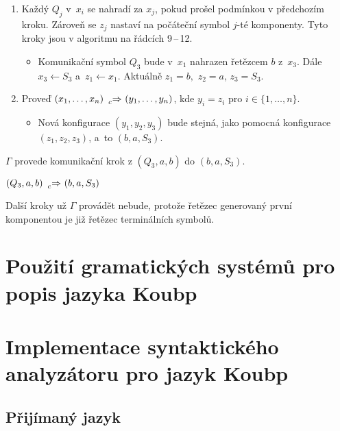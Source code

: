 \begin{example}
\begin{enumerate}
        \item Každý $Q_j$ v~$x_i$ se nahradí za $x_j$, pokud prošel podmínkou v předchozím kroku.
        Zároveň se $z_j$ nastaví na počáteční symbol $j$-té komponenty.
        Tyto kroky jsou v algoritmu na řádcích 9\,--\,12.
        \begin{itemize}[label=$\circ$]
            \item Komunikační symbol $Q_3$ bude v~$x_1$ nahrazen řetězcem $b$ z~$x_3$. Dále $x_3 \gets S_3$ a~$z_1 \gets x_1$.
            Aktuálně $z_1 = b,$ $z_2 = a$, $z_3 = S_3$. 
        \end{itemize}
        \item Proveď $(x_1, \ldots, x_n) \ \prescript{}{c}{\Rightarrow} \ (y_1, \ldots, y_n)$, kde $y_i = z_i$ pro $i \in \{1, \ldots, n\}$.
        \begin{itemize}[label=$\circ$]
            \item Nová konfigurace $(y_1, y_2, y_3)$ bude stejná, jako pomocná konfigurace $(z_1, z_2, z_3)$, a~to $(b, a, S_3)$.
        \end{itemize}
    \end{enumerate}
    $\Gamma$ provede komunikační krok z $(Q_3, a, b)$ do $(b, a, S_3)$.
    \begin{center}
        $(Q_3, a, b) \ \prescript{}{c}{\Rightarrow} \ (b, a, S_3)$
    \end{center}
    Další kroky už $\Gamma$ provádět nebude, protože řetězec generovaný první komponentou je již řetězec terminálních symbolů.
\end{example}

\chapter{Použití gramatických systémů pro popis jazyka Koubp}

\chapter{Implementace syntaktického analyzátoru pro jazyk Koubp }\label{7_implementace}


\section{Přijímaný jazyk}

